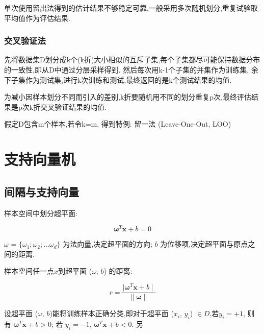 \documentclass[12pt]{article}
\numberwithin{equation}{section}%
\begin{document}
单次使用留出法得到的估计结果不够稳定可靠,一般采用多次随机划分,重复试验取平均值作为评估结果.

\subsubsection{交叉验证法}

先将数据集D划分成k个(k折)大小相似的互斥子集,每个子集都尽可能保持数据分布的一致性,即从D中通过分层采样得到. 然后每次用k-1个子集的并集作为训练集, 余下子集作为测试集,进行k次训练和测试,最终返回的是k个测试结果的均值.

为减小因样本划分不同而引入的差别,k折要随机用不同的划分重复p次,最终评估结果是p次k折交叉验证结果的均值.

假定D包含m个样本,若令k=m, 得到特例: 留一法 (Leave-One-Out, LOO)

\section{支持向量机}

\subsection{间隔与支持向量}

样本空间中划分超平面:

\begin{equation}
\boldsymbol{\omega}^{T}\boldsymbol{x}+b=0
\end{equation}

\boldmath$\omega$  \unboldmath = $\{\omega_{1};\omega_{2};\ldots \omega_{d}\}$ 为法向量,决定超平面的方向; $b$ 为位移项,决定超平面与原点之间的距离.

样本空间任一点\boldmath$x$到超平面 \boldmath($\omega$, \unboldmath$b$) 的距离:

\begin{equation}
r=\dfrac{\mid \boldsymbol{\omega}^{T}\boldsymbol{x}+b \mid}{\parallel \boldsymbol{\omega} \parallel}
\end{equation}

设超平面 \boldmath($\omega$, \unboldmath$b$)能将训练样本正确分类,即对于超平面 \boldmath($x_{i}$, \unboldmath$y_{i}$) $\in D$,若$y_{i}=+1$, 则有
$ \boldsymbol{\omega}^{T}\boldsymbol{x}+b>0$; 若 $y_{i}=-1$, $ \boldsymbol{\omega}^{T}\boldsymbol{x}+b<0$. 另
\end{document}
